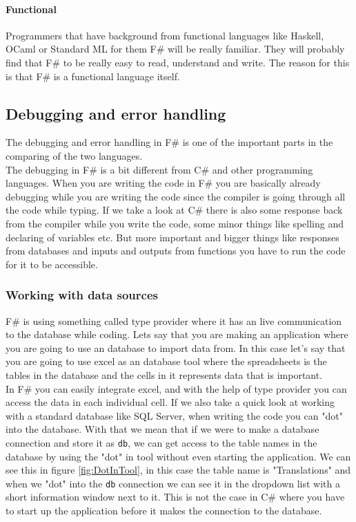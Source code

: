 \documentclass[12pt, a4paper]{article}
\newcommand{\code}[1]{{\small \texttt{#1}}}
\begin{document}
\paragraph{Functional}
Programmers that have background from functional languages like Haskell, OCaml or Standard ML for them F\# will be really familiar. They will probably find that F\# to be really easy to read, understand and write. The reason for this is that F\# is a functional language itself. 

\newpage
\subsection{Debugging and error handling}
The debugging and error handling in F\# is one of the important parts in the comparing of the two languages.\\
 
The debugging in F\# is a bit different from C\# and other programming languages. When you are writing the code in F\# you are basically already debugging while you are writing the code since the compiler is going through all the code while typing. If we take a look at C\# there is also some response back from the compiler while you write the code, some minor things like spelling and declaring of variables etc. But more important and bigger things like responses from databases and inputs and outputs from functions you have to run the code for it to be accessible.


\newpage
\subsubsection{Working with data sources}

F\# is using something called type provider where it has an live communication to the database while coding. Lets say that you are making an application where you are going to use an database to import data from. In this case let's say that you are going to use excel as an database tool where the spreadsheets is the tables in the database and the cells in it represents data that is important. \\

In F\# you can easily integrate excel, and with the help of type provider you can access the data in each individual cell. If we also take a quick look at working with a standard database like SQL Server, when writing the code you can "dot" into the database. With that we mean that if we were to make a database connection and store it as \code{db}, we can get access to the table names in the database by using the "dot" in tool without even starting the application. We can see this in figure \ref{fig:DotInTool}, in this case the table name is "Translations" and when we "dot" into the \code{db} connection we can see it in the dropdown list with a short information window next to it. This is not the case in C\# where you have to start up the application before it makes the connection to the database.
\end{document}

